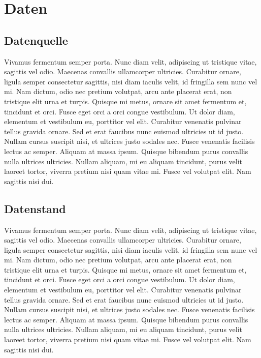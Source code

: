 \chapter{Daten}

\section{Datenquelle}
Vivamus fermentum semper porta. Nunc diam velit, adipiscing ut tristique vitae, sagittis vel odio. Maecenas convallis ullamcorper ultricies. Curabitur ornare, ligula semper consectetur sagittis, nisi diam iaculis velit, id fringilla sem nunc vel mi. Nam dictum, odio nec pretium volutpat, arcu ante placerat erat, non tristique elit urna et turpis. Quisque mi metus, ornare sit amet fermentum et, tincidunt et orci. Fusce eget orci a orci congue vestibulum. Ut dolor diam, elementum et vestibulum eu, porttitor vel elit. Curabitur venenatis pulvinar tellus gravida ornare. Sed et erat faucibus nunc euismod ultricies ut id justo. Nullam cursus suscipit nisi, et ultrices justo sodales nec. Fusce venenatis facilisis lectus ac semper. Aliquam at massa ipsum. Quisque bibendum purus convallis nulla ultrices ultricies. Nullam aliquam, mi eu aliquam tincidunt, purus velit laoreet tortor, viverra pretium nisi quam vitae mi. Fusce vel volutpat elit. Nam sagittis nisi dui.

\section{Datenstand}
Vivamus fermentum semper porta. Nunc diam velit, adipiscing ut tristique vitae, sagittis vel odio. Maecenas convallis ullamcorper ultricies. Curabitur ornare, ligula semper consectetur sagittis, nisi diam iaculis velit, id fringilla sem nunc vel mi. Nam dictum, odio nec pretium volutpat, arcu ante placerat erat, non tristique elit urna et turpis. Quisque mi metus, ornare sit amet fermentum et, tincidunt et orci. Fusce eget orci a orci congue vestibulum. Ut dolor diam, elementum et vestibulum eu, porttitor vel elit. Curabitur venenatis pulvinar tellus gravida ornare. Sed et erat faucibus nunc euismod ultricies ut id justo. Nullam cursus suscipit nisi, et ultrices justo sodales nec. Fusce venenatis facilisis lectus ac semper. Aliquam at massa ipsum. Quisque bibendum purus convallis nulla ultrices ultricies. Nullam aliquam, mi eu aliquam tincidunt, purus velit laoreet tortor, viverra pretium nisi quam vitae mi. Fusce vel volutpat elit. Nam sagittis nisi dui.

